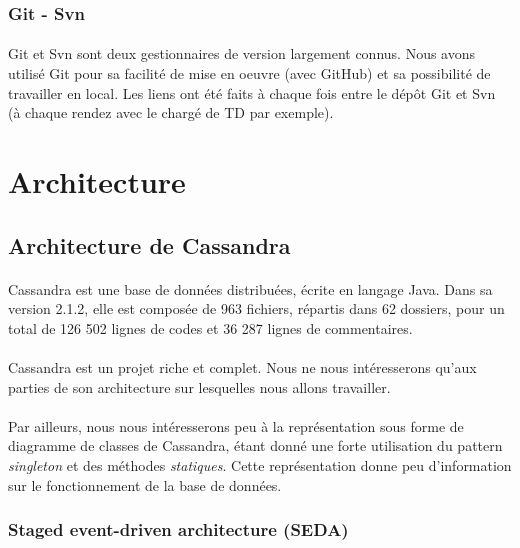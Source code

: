 \documentclass[12pt]{article}
\begin{document}
\subsubsection{Git - Svn}

\paragraph{}Git et Svn sont deux gestionnaires de version largement connus. Nous avons utilisé Git pour sa facilité de mise en oeuvre (avec GitHub) et sa possibilité de travailler en local. Les liens ont été faits à chaque fois entre le dépôt Git et Svn (à chaque rendez avec le chargé de TD par exemple).

\newpage

\section{Architecture}
\label{sec:Architecture}


\subsection{Architecture de Cassandra}

\paragraph{} Cassandra est une base de données distribuées, écrite en langage Java. Dans sa version 2.1.2, elle est composée de 963 fichiers, répartis dans 62 dossiers, pour un total de 126 502 lignes de codes et 36 287 lignes de commentaires.

\paragraph{} Cassandra est un projet riche et complet. Nous ne nous intéresserons qu'aux parties de son architecture sur lesquelles nous allons travailler.

\paragraph{} Par ailleurs, nous nous intéresserons peu à la représentation sous forme de diagramme de classes de Cassandra, étant donné une forte utilisation du pattern \textit{singleton} et des méthodes \textit{statiques}. Cette représentation donne peu d'information sur le fonctionnement de la base de données.

\subsubsection{Staged event-driven architecture (SEDA)}
\end{document}
